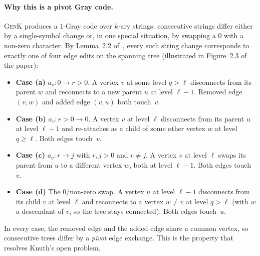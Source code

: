 \documentclass{article}
\begin{document}
\paragraph{Why this is a pivot Gray code.}
\textsc{GenK} produces a $1$-Gray code over $k$-ary strings: consecutive strings differ either by a single-symbol change or, in one special situation, by swapping a $0$ with a non-zero character. By Lemma~2.2 of~\cite{liu2026}, every such string change corresponds to exactly one of four edge edits on the spanning tree (illustrated in Figure~2.3 of the paper):
\begin{itemize}
    \item \textbf{Case (a)} $a_v\colon 0\to r>0$. A vertex $v$ at some level $q>\ell$ disconnects from its parent $w$ and reconnects to a new parent $u$ at level $\ell-1$. Removed edge $(v,w)$ and added edge $(v,u)$ both touch~$v$.
    \item \textbf{Case (b)} $a_v\colon r>0\to 0$. A vertex $v$ at level $\ell$ disconnects from its parent $u$ at level $\ell-1$ and re-attaches as a child of some other vertex $w$ at level $q\geq\ell$. Both edges touch~$v$.
    \item \textbf{Case (c)} $a_v\colon r\to j$ with $r,j>0$ and $r\neq j$. A vertex $v$ at level $\ell$ swaps its parent from $u$ to a different vertex $w$, both at level $\ell-1$. Both edges touch~$v$.
    \item \textbf{Case (d)} The $0$/non-zero swap. A vertex $u$ at level $\ell-1$ disconnects from its child $v$ at level $\ell$ and reconnects to a vertex $w\neq v$ at level $q>\ell$ (with $w$ a descendant of $v$, so the tree stays connected). Both edges touch~$u$.
\end{itemize}
In every case, the removed edge and the added edge share a common vertex, so consecutive trees differ by a \emph{pivot} edge exchange. This is the property that resolves Knuth's open problem.
\end{document}
